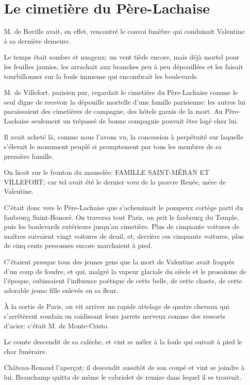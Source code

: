 \chapter{Le cimetière du Père-Lachaise} 

\lettrine{M}{.} de Boville avait, en effet, rencontré le convoi funèbre qui conduisait Valentine à sa dernière demeure. 

\zz
Le temps était sombre et nuageux; un vent tiède encore, mais déjà mortel pour les feuilles jaunies, les arrachait aux branches peu à peu dépouillées et les faisait tourbillonner sur la foule immense qui encombrait les boulevards. 

M. de Villefort, parisien pur, regardait le cimetière du Père-Lachaise comme le seul digne de recevoir la dépouille mortelle d'une famille parisienne; les autres lui paraissaient des cimetières de campagne, des hôtels garnis de la mort. Au Père-Lachaise seulement un trépassé de bonne compagnie pouvait être logé chez lui. 

Il avait acheté là, comme nous l'avons vu, la concession à perpétuité sur laquelle s'élevait le monument peuplé si promptement par tous les membres de sa première famille. 

On lisait sur le fronton du mausolée: FAMILLE SAINT-MÉRAN ET VILLEFORT; car tel avait été le dernier vœu de la pauvre Renée, mère de Valentine. 

C'était donc vers le Père-Lachaise que s'acheminait le pompeux cortège parti du faubourg Saint-Honoré. On traversa tout Paris, on prit le faubourg du Temple, puis les boulevards extérieurs jusqu'au cimetière. Plus de cinquante voitures de maîtres suivaient vingt voitures de deuil, et, derrière ces cinquante voitures, plus de cinq cents personnes encore marchaient à pied. 

C'étaient presque tous des jeunes gens que la mort de Valentine avait frappés d'un coup de foudre, et qui, malgré la vapeur glaciale du siècle et le prosaïsme de l'époque, subissaient l'influence poétique de cette belle, de cette chaste, de cette adorable jeune fille enlevée en sa fleur. 

À la sortie de Paris, on vit arriver un rapide attelage de quatre chevaux qui s'arrêtèrent soudain en raidissant leurs jarrets nerveux comme des ressorts d'acier: c'était M. de Monte-Cristo. 

Le comte descendit de sa calèche, et vint se mêler à la foule qui suivait à pied le char funéraire. 

Château-Renaud l'aperçut; il descendit aussitôt de son coupé et vint se joindre à lui. Beauchamp quitta de même le cabriolet de remise dans lequel il se trouvait. 

